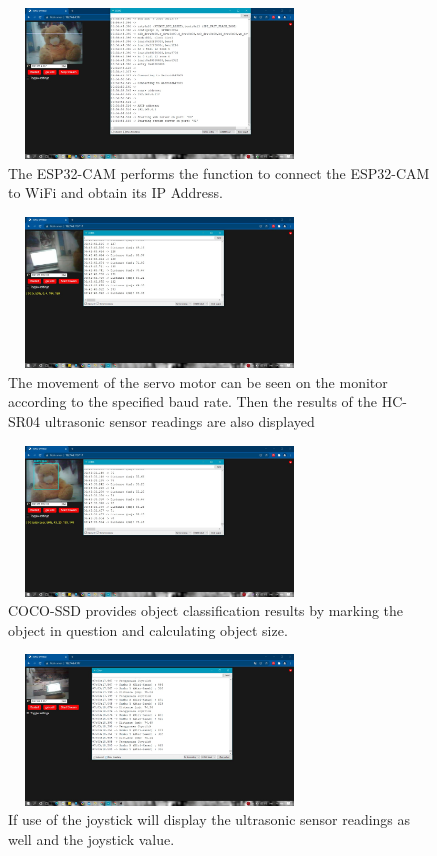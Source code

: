 \documentclass[conference]{IEEEtran}
\begin{document}
\begin{figure}[htbp]
\centerline{\includegraphics[width=8cm, height=4cm]{Lampiran/lam3.jpg}}
\caption{The ESP32-CAM performs the function to connect the ESP32-CAM to WiFi and obtain its IP Address.}
\label{lam3}
\end{figure}
\begin{figure}[htbp]
\centerline{\includegraphics[width=8cm, height=4cm]{Lampiran/lam1.jpg}}
\caption{The movement of the servo motor can be seen on the monitor according to the specified baud rate. Then the results of the HC-SR04 ultrasonic sensor readings are also displayed}
\label{lam1}
\end{figure}
\begin{figure}[htbp]
\centerline{\includegraphics[width=8cm, height=4cm]{Lampiran/lam2.jpg}}
\caption{COCO-SSD provides object classification results by marking the object in question and calculating object size.}
\label{lam2}
\end{figure}
\begin{figure}[htbp]
\centerline{\includegraphics[width=8cm, height=4cm]{Lampiran/lam4.jpg}}
\caption{If use of the joystick will display the ultrasonic sensor readings as well and the joystick value.}
\label{lam4}
\end{figure}
\end{document}
